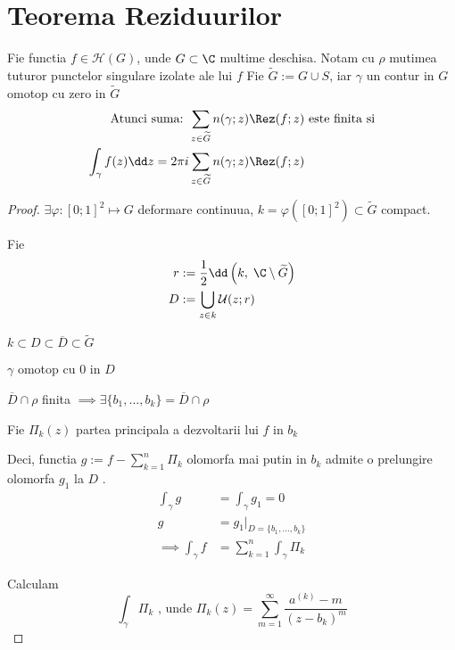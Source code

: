 \section{Teorema Reziduurilor}

\begin{theorem}
    Fie functia $f\in \mathcal{H}(G)$, unde $G \subset \C$ multime deschisa.
    Notam cu $\rho$  mutimea tuturor punctelor singulare izolate ale lui $f$
    Fie $\widetilde{G}:=G \cup S $, iar $\gamma$ un contur in $G$ omotop cu zero
     in $\widetilde{G}$
    \begin{align*}
        \text{Atunci suma: }
        &\sum_{z \in \widetilde{G}} {n(\gamma;z) \Rez(f;z)}
        \text{ este finita si}  \\
        \int_{\gamma} f(z) \dd z = 2\pi i &\sum_{z \in \widetilde{G}} n(\gamma;z) \Rez(f;z)
    \end{align*}
    \begin{proof}
        $\exists \varphi:[0;1]^2 \mapsto G$ deformare continuua,
        $k = \varphi ([0;1]^2) \subset \widetilde{G}$ compact.

        Fie
        \begin{align*}
            r &:= \frac{1}{2} \dd \left(k,\; \C \setminus \widetilde{G}\right)
            \\
            D &:= \bigcup_{z\in k} \mathcal{U}(z;r)
        \end{align*}

        $k \subset D \subset \overline{D} \subset \widetilde{G}$

        $\gamma$ omotop cu $0$ in $D$

        $\overline{D} \cap \rho$ finita
                $\implies \exists \{b_1, \dotsc, b_k \} = \overline{D} \cap \rho$

        Fie $\Pi_{k}(z)$ partea principala a dezvoltarii lui $f$ in $b_k$

        Deci, functia $\displaystyle g := f - \sum_{k=1}^{n} \Pi_k$
        olomorfa mai putin in $b_k$ admite o prelungire olomorfa $g_1$ la $D$ .
        \begin{align*}
            \int_{\gamma}  g &= \int_{\gamma} g_1 = 0 \\
                           g &= g_1 |_{D=\{b_1, \dotsc, b_k\}}\\
            \implies \int_{\gamma} f &= \sum_{k=1}^{n} \int_{\gamma} \Pi_k
        \end{align*}

        Calculam
        \[
            \int_{\gamma} \Pi_k \text{ , unde }
            \Pi_k(z) = \sum_{m=1}^{\infty} \frac{a^{(k)} - m }{(z - b_k)^m}
        \]


\end{proof}
\end{theorem}
